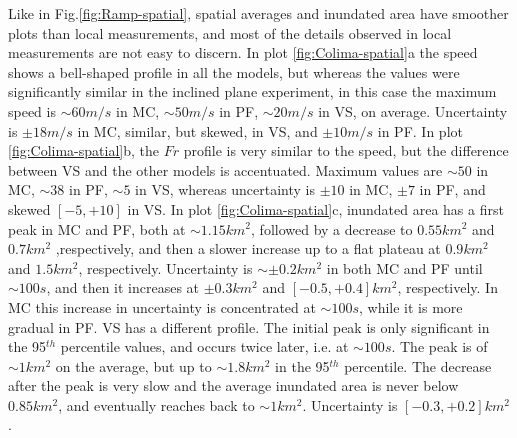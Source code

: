 \documentclass{article}
\begin{document}
Like in Fig.\ref{fig:Ramp-spatial}, spatial averages and inundated area have smoother plots than local measurements, and most of the details observed in local measurements are not easy to discern. In plot \ref{fig:Colima-spatial}a the speed shows a bell-shaped profile in all the models, but whereas the values were significantly similar in the inclined plane experiment, in this case the maximum speed is $\sim 60 m/s$ in MC, $\sim 50 m/s$ in PF, $\sim 20 m/s$ in VS, on average. Uncertainty is $\pm 18 m/s$ in MC, similar, but skewed, in VS, and $\pm 10 m/s$ in PF. In plot \ref{fig:Colima-spatial}b, the $Fr$ profile is very similar to the speed, but the difference between VS and the other models is accentuated. Maximum values are $\sim 50$ in MC, $\sim 38$ in PF, $\sim 5$ in VS, whereas uncertainty is $\pm 10$ in MC, $\pm 7$ in PF, and skewed $[-5, +10]$ in VS. In plot \ref{fig:Colima-spatial}c, inundated area has a first peak in MC and PF, both at $\sim 1.15 km^2$, followed by a decrease to $0.55 km^2$ and $0.7 km^2$ ,respectively, and then a slower increase up to a flat plateau at $0.9 km^2$ and $1.5 km^2$, respectively. Uncertainty is $\sim \pm 0.2 km^2$ in both MC and PF until $\sim 100 s$, and then it increases at $\pm 0.3 km^2$ and $[-0.5, +0.4] km^2$, respectively. In MC this increase in uncertainty is concentrated at $\sim 100 s$, while it is more gradual in PF. VS has a different profile. The initial peak is only significant in the 95$^{th}$ percentile values, and occurs twice later, i.e. at $\sim 100 s$. The peak is of $\sim 1 km^2$ on the average, but up to $\sim 1.8 km^2$ in the 95$^{th}$ percentile. The decrease after the peak is very slow and the average inundated area is never below $0.85 km^2$, and eventually reaches back to $\sim 1 km^2$. Uncertainty is $[-0.3, +0.2] km^2$.
\end{document}
